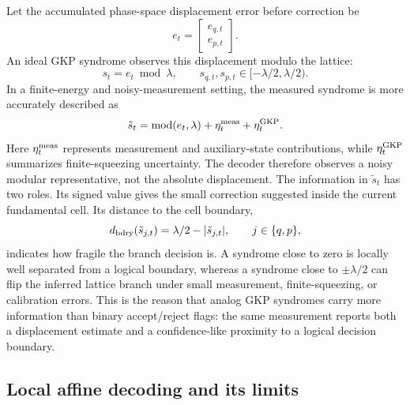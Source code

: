 \documentclass[11pt]{article}
\begin{document}
Let the accumulated phase-space displacement error before correction be
\begin{equation}
    e_t=\begin{bmatrix}e_{q,t}\\e_{p,t}\end{bmatrix}.
\end{equation}
An ideal GKP syndrome observes this displacement modulo the lattice:
\begin{equation}
    s_t = e_t \bmod \lambda,
    \qquad
    s_{q,t},s_{p,t}\in[-\lambda/2,\lambda/2).
\end{equation}
In a finite-energy and noisy-measurement setting, the measured syndrome is
more accurately described as
\begin{equation}
    \tilde{s}_t={\rm mod}(e_t,\lambda)+\eta_t^{\rm meas}+\eta_t^{\rm GKP}.
\end{equation}
Here \(\eta_t^{\rm meas}\) represents measurement and auxiliary-state
contributions, while \(\eta_t^{\rm GKP}\) summarizes finite-squeezing
uncertainty.  The decoder therefore observes a noisy modular representative,
not the absolute displacement.
The information in \(\tilde{s}_t\) has two roles.  Its signed value gives the
small correction suggested inside the current fundamental cell.  Its distance
to the cell boundary,
\begin{equation}
    d_{\rm bdry}(\tilde{s}_{j,t})
    =
    \lambda/2-|\tilde{s}_{j,t}|,\qquad j\in\{q,p\},
\end{equation}
indicates how fragile the branch decision is.  A syndrome close to zero is
locally well separated from a logical boundary, whereas a syndrome close to
\(\pm\lambda/2\) can flip the inferred lattice branch under small measurement,
finite-squeezing, or calibration errors.  This is the reason that analog GKP
syndromes carry more information than binary accept/reject flags: the same
measurement reports both a displacement estimate and a confidence-like
proximity to a logical decision boundary.

\subsection{Local affine decoding and its limits}
\end{document}
